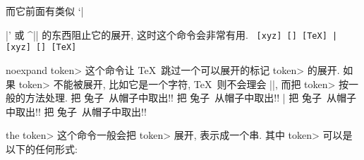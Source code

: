 而它前面有类似 `|{|' 或 ^|\string| 的东西阻止它的展开,
这时这个命令会非常有用.
\example
\def\aa{xyz}
\tt %
[\string\aa]  [\expandafter\string\aa]
[\expandafter\string\csname TeX\endcsname]
|
\produces
\def\aa{xyz}
\tt
[\string\aa]  [\expandafter\string\aa]
[\expandafter\string\csname TeX\endcsname]
\endexample
\enddesc

\begindesc
\cts noexpand {\<token>}
\explain
这个命令让 \TeX\ 跳过一个可以展开的标记 \<token> 的展开.
如果 \<token> 不能被展开, 比如它是一个字符,
\TeX\ 则不会理会 |\noexpand|, 而把 \<token> 按一般的方法处理.
\example
\def\bunny{兔子}
\edef\magic{把 \noexpand\bunny\ 从帽子中取出!! }
\let\oldbunny=\bunny \def\bunny{兔} \magic
\let\bunny=\oldbunny \magic
|
\produces
\def\bunny{兔子}
\edef\magic{把 \noexpand\bunny\ 从帽子中取出!! }
\let\oldbunny=\bunny \def\bunny{兔} \magic
\let\bunny=\oldbunny \magic
\endexample
\enddesc

\begindesc
\cts the {\<token>}
\explain
这个命令一般会把 \<token> 展开, 表示成一个串.
其中 \<token>  可以是以下的任何形式:

}
